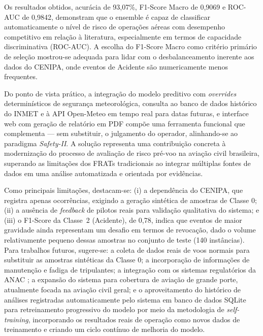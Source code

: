 \documentclass[english,brazilian]{UNISINOSartigo}
\begin{document}
Os resultados obtidos, acurácia de 93,07\%, F1-Score Macro de 0,9069 e
ROC-AUC de 0,9842, demonstram que o ensemble é capaz de classificar
automaticamente o nível de risco de operações aéreas com desempenho competitivo
em relação à literatura, especialmente em termos de capacidade discriminativa
(ROC-AUC). A escolha do F1-Score Macro como critério primário de seleção mostrou-se
adequada para lidar com o desbalanceamento inerente aos dados do CENIPA, onde
eventos de Acidente são numericamente menos frequentes.

Do ponto de vista prático, a integração do modelo preditivo com \textit{overrides}
determinísticos de segurança meteorológica, consulta ao banco de dados histórico
do INMET e à API Open-Meteo em tempo real para datas futuras, e interface web
com geração de relatório em PDF compõe uma ferramenta funcional que complementa
--- sem substituir, o julgamento do operador, alinhando-se ao paradigma
\textit{Safety-II}. A solução representa uma contribuição
concreta à modernização do processo de avaliação de risco pré-voo na aviação civil
brasileira, superando as limitações dos FRATs tradicionais ao integrar múltiplas
fontes de dados em uma análise automatizada e orientada por evidências.

Como principais limitações, destacam-se: (i) a dependência do CENIPA, que registra
apenas ocorrências, exigindo a geração sintética de amostras de Classe 0; (ii) a
ausência de \textit{feedback} de pilotos reais para validação qualitativa do sistema;
e (iii) o F1-Score da Classe~2 (Acidente), de 0,78, indica que eventos de maior
gravidade ainda representam um desafio em termos de revocação, dado o volume
relativamente pequeno dessas amostras no conjunto de teste (140 instâncias). Para trabalhos
futuros, sugere-se: a coleta de dados reais de voos normais para substituir as
amostras sintéticas da Classe 0; a incorporação de informações de manutenção e
fadiga de tripulantes; a integração com os sistemas regulatórios da ANAC
\cite{ANAC2024}; a expansão do sistema para cobertura de aviação de grande
porte, atualmente focada na aviação civil geral; e o aproveitamento do
histórico de análises registradas automaticamente pelo sistema em banco de
dados SQLite para retreinamento progressivo do modelo por meio da metodologia
de \textit{self-training}, incorporando os resultados reais de operação como
novos dados de treinamento e criando um ciclo contínuo de melhoria do modelo.



\appendix
\end{document}
